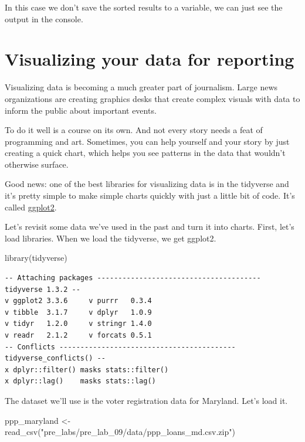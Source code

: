 \documentclass[
  letterpaper,
  DIV=11,
  numbers=noendperiod]{scrreprt}
\newenvironment{Shaded}{\begin{snugshade}}{\end{snugshade}}
\newcommand{\FunctionTok}[1]{\textcolor[rgb]{0.28,0.35,0.67}{#1}}
\newcommand{\NormalTok}[1]{\textcolor[rgb]{0.00,0.23,0.31}{#1}}
\newcommand{\OtherTok}[1]{\textcolor[rgb]{0.00,0.23,0.31}{#1}}
\newcommand{\StringTok}[1]{\textcolor[rgb]{0.13,0.47,0.30}{#1}}
\begin{document}
In this case we don't save the sorted results to a variable, we can just
see the output in the console.


\hypertarget{visualizing-your-data-for-reporting}{%
\chapter{Visualizing your data for
reporting}\label{visualizing-your-data-for-reporting}}

Visualizing data is becoming a much greater part of journalism. Large
news organizations are creating graphics desks that create complex
visuals with data to inform the public about important events.

To do it well is a course on its own. And not every story needs a feat
of programming and art. Sometimes, you can help yourself and your story
by just creating a quick chart, which helps you see patterns in the data
that wouldn't otherwise surface.

Good news: one of the best libraries for visualizing data is in the
tidyverse and it's pretty simple to make simple charts quickly with just
a little bit of code. It's called
\href{https://ggplot2.tidyverse.org/}{ggplot2}.

Let's revisit some data we've used in the past and turn it into charts.
First, let's load libraries. When we load the tidyverse, we get ggplot2.

\begin{Shaded}
\begin{Highlighting}[]
\FunctionTok{library}\NormalTok{(tidyverse)}
\end{Highlighting}
\end{Shaded}

\begin{verbatim}
-- Attaching packages --------------------------------------- tidyverse 1.3.2 --
v ggplot2 3.3.6     v purrr   0.3.4
v tibble  3.1.7     v dplyr   1.0.9
v tidyr   1.2.0     v stringr 1.4.0
v readr   2.1.2     v forcats 0.5.1
-- Conflicts ------------------------------------------ tidyverse_conflicts() --
x dplyr::filter() masks stats::filter()
x dplyr::lag()    masks stats::lag()
\end{verbatim}

The dataset we'll use is the voter registration data for Maryland. Let's
load it.

\begin{Shaded}
\begin{Highlighting}[]
\NormalTok{ppp\_maryland }\OtherTok{\textless{}{-}} \FunctionTok{read\_csv}\NormalTok{(}\StringTok{"pre\_labs/pre\_lab\_09/data/ppp\_loans\_md.csv.zip"}\NormalTok{)}
\end{Highlighting}
\end{Shaded}
\end{document}
